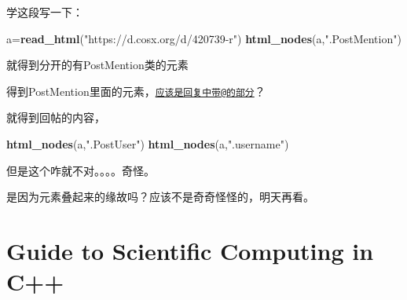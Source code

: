 \documentclass[
]{book}
\newenvironment{Shaded}{\begin{snugshade}}{\end{snugshade}}
\newcommand{\KeywordTok}[1]{\textcolor[rgb]{0.13,0.29,0.53}{\textbf{#1}}}
\newcommand{\NormalTok}[1]{#1}
\newcommand{\OperatorTok}[1]{\textcolor[rgb]{0.81,0.36,0.00}{\textbf{#1}}}
\newcommand{\StringTok}[1]{\textcolor[rgb]{0.31,0.60,0.02}{#1}}
\theoremstyle{definition}
\theoremstyle{definition}
\theoremstyle{definition}
\theoremstyle{remark}
\begin{document}
学这段写一下：

\begin{Shaded}
\begin{Highlighting}[]
\NormalTok{a=}\KeywordTok{read_html}\NormalTok{(}\StringTok{"https://d.cosx.org/d/420739-r"}\NormalTok{)}
\KeywordTok{html_nodes}\NormalTok{(a,}\StringTok{".PostMention"}\NormalTok{)}
\end{Highlighting}
\end{Shaded}

就得到分开的有PostMention类的元素

\begin{Shaded}
\end{Shaded}

得到PostMention里面的元素，\href{mailto:应该是回复中带@的部分}{\nolinkurl{应该是回复中带@的部分}}？

\begin{Shaded}
\end{Shaded}

就得到回帖的内容，

\begin{Shaded}
\begin{Highlighting}[]
\KeywordTok{html_nodes}\NormalTok{(a,}\StringTok{".PostUser"}\NormalTok{)}
\KeywordTok{html_nodes}\NormalTok{(a,}\StringTok{".username"}\NormalTok{)}
\end{Highlighting}
\end{Shaded}

但是这个咋就不对。。。。奇怪。

是因为元素叠起来的缘故吗？应该不是奇奇怪怪的，明天再看。

\hypertarget{guide-to-scientific-computing-in-c}{%
\chapter{Guide to Scientific Computing in C++}\label{guide-to-scientific-computing-in-c}}
\end{document}
